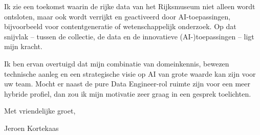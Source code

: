 \documentclass[10pt,a4paper]{article}
\begin{document}
\begin{adjustwidth}{15mm}{15mm}
Ik zie een toekomst waarin de rijke data van het Rijksmuseum niet alleen wordt ontsloten, maar ook wordt verrijkt en geactiveerd door AI-toepassingen, bijvoorbeeld voor contentgeneratie of wetenschappelijk onderzoek. Op dat snijvlak -- tussen de collectie, de data en de innovatieve (AI-)toepassingen -- ligt mijn kracht.

Ik ben ervan overtuigd dat mijn combinatie van domeinkennis, bewezen technische aanleg en een strategische visie op AI van grote waarde kan zijn voor uw team. Mocht er naast de pure Data Engineer-rol ruimte zijn voor een meer hybride profiel, dan zou ik mijn motivatie zeer graag in een gesprek toelichten.

\vspace{2em}

Met vriendelijke groet,

\vspace{3em}

Jeroen Kortekaas

\end{adjustwidth}
\end{document}
